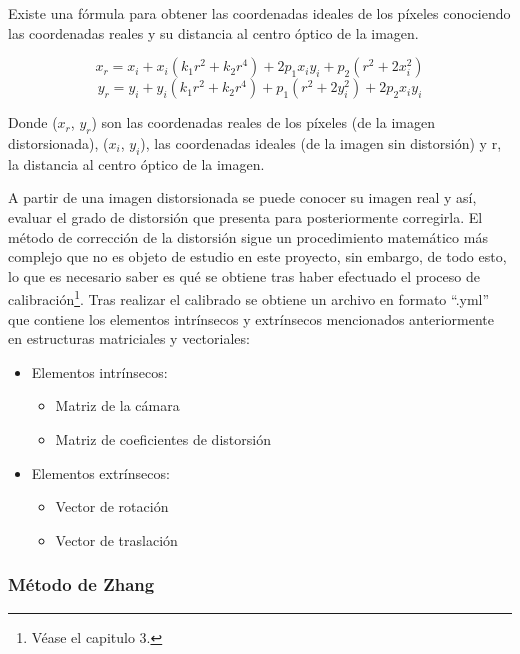 Existe una fórmula para obtener las coordenadas ideales de los píxeles conociendo las coordenadas reales y su distancia al centro óptico de la imagen.

\begin{equation}
x_r = x_i + x_i(k_1r^2 + k_2r^4) + 2p_1x_iy_i + p_2(r^2 + 2x_i^2) 
\label{xreal}
\end{equation}
\begin{equation}
y_r = y_i + y_i(k_1r^2 + k_2r^4) + p_1(r^2 + 2y_i^2) + 2p_2x_iy_i
\label{yreal}
\end{equation}

Donde ($x_r$, $y_r$) son las coordenadas reales de los píxeles (de la imagen distorsionada), ($x_i$, $y_i$), las coordenadas ideales (de la imagen sin distorsión) y r, la distancia al centro óptico de la imagen.

A partir de una imagen distorsionada se puede conocer su imagen real y así, evaluar el grado de distorsión que presenta para posteriormente corregirla. El método de corrección de la distorsión sigue un procedimiento matemático más complejo que no es objeto de estudio en este proyecto, sin embargo, de todo esto, lo que es necesario saber es qué se obtiene tras haber efectuado el proceso de calibración\footnote{Véase el capitulo 3.}. Tras realizar el calibrado se obtiene un archivo en formato ``.yml'' que contiene los elementos intrínsecos y extrínsecos mencionados anteriormente en estructuras matriciales y vectoriales: 

\begin{itemize}
    \item Elementos intrínsecos:
    \begin{itemize}
        \item Matriz de la cámara
        \item Matriz de coeficientes de distorsión
    \end{itemize}
    \item Elementos extrínsecos:
    \begin{itemize}
        \item Vector de rotación
        \item Vector de traslación
    \end{itemize}
\end{itemize}

\subsubsection{Método de Zhang}\label{s2_2_3_1}

